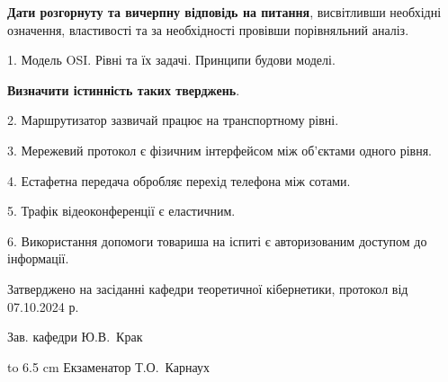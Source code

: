 \documentclass[12pt, ukrainian]{article}
\begin{document}
{
\qquad\textbf{Дати розгорнуту та вичерпну відповідь на питання}, висвітливши необхідні означення, властивості та за необхідності провівши порівняльний аналіз.

1. Модель OSI. Рівні та їх задачі. Принципи будови моделі.



\qquad\textbf{Визначити істинність таких тверджень}.

2. Маршрутизатор зазвичай працює на транспортному рівні.


3. Мережевий протокол є фізичним інтерфейсом між об'єктами одного рівня.


4. Естафетна передача обробляє перехід телефона між сотами.


5. Трафік відеоконференції є еластичним.


6. Використання допомоги товариша на іспиті є авторизованим доступом до інформації.

}
{\smallskip\smallskip \begin {scriptsize} Затверджено на засіданні кафедри теоретичної кібернетики, протокол   від   07.10.2024 р.\par\smallskip\smallskip\smallskip\smallskip
{\parbox {6.5 cm} {Зав. кафедри \dotfill Ю.В.~Крак}}\hspace {0.7cm} {\hbox to 6.5 cm { Екзаменатор \dotfill Т.О.~Карнаух}} \end{scriptsize}}
\newpage
\end{document}
